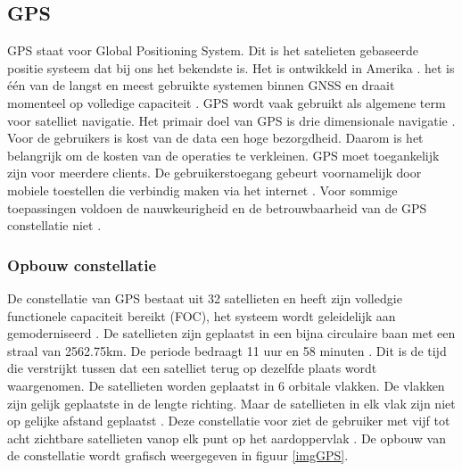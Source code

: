 \subsection{GPS}
\label{LGPS} 
GPS staat voor Global Positioning System. Dit is het satelieten gebaseerde positie systeem dat bij ons het bekendste is. Het is ontwikkeld in Amerika \cite{LBibGNSS}\cite{LBibGNSS3}. het is \'e\'en van de langst en meest gebruikte systemen binnen GNSS en draait momenteel op volledige capaciteit \cite{LBibGNSS4,LBibGNSS8}. GPS wordt vaak gebruikt als algemene term voor satelliet navigatie. Het primair doel van GPS is drie dimensionale navigatie \cite{LBibGNSS8}. Voor de gebruikers is kost van de data een hoge bezorgdheid. Daarom is het belangrijk om de kosten van de operaties te verkleinen. GPS moet toegankelijk zijn voor meerdere clients. De gebruikerstoegang gebeurt voornamelijk door mobiele toestellen die verbindig maken via het internet \cite{LBibGPS}. Voor sommige toepassingen voldoen de nauwkeurigheid en de betrouwbaarheid van de GPS constellatie niet \cite{LBibGNSS6}.

\subsubsection{Opbouw constellatie}
 De constellatie van GPS bestaat uit 32 satellieten en heeft zijn volledgie functionele capaciteit bereikt (FOC), het systeem wordt geleidelijk aan gemoderniseerd \cite{LBibGNSS4}. De satellieten zijn geplaatst in een bijna circulaire baan met een straal van 2562.75km. De periode bedraagt 11 uur en 58 minuten \cite{LBibGNSS6,LBibGNSS8}. Dit is de tijd die verstrijkt tussen dat een satelliet terug op dezelfde plaats wordt waargenomen. De satellieten worden geplaatst in 6 orbitale vlakken. De vlakken zijn gelijk geplaatste in de lengte richting. Maar de satellieten in elk vlak zijn niet op gelijke afstand geplaatst \cite{LBibGNSS6}. Deze constellatie voor ziet de gebruiker met vijf tot acht zichtbare satellieten vanop elk punt op het aardoppervlak \cite{LBibGNSS8}. De opbouw van de constellatie wordt grafisch weergegeven in figuur \ref{imgGPS}.
 
